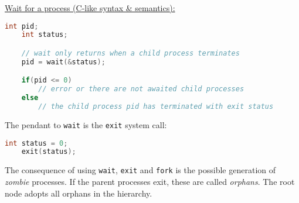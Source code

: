 \par{
	\noindent\underline{Wait for a process (C-like syntax \& semantics):}
	\begin{lstlisting}[language = C, frame = none]
	int pid;
	int status;

	// wait only returns when a child process terminates
	pid = wait(&status);

	if(pid <= 0)
		// error or there are not awaited child processes
	else
		// the child process pid has terminated with exit status
	\end{lstlisting}
}
\par{
	\noindent The pendant to \texttt{wait} is the \texttt{exit} system call:
	\begin{lstlisting}[language = C, frame = none]
	int status = 0;
	exit(status);
	\end{lstlisting}
}
\par{
	\noindent
	The consequence of using \texttt{wait}, \texttt{exit} and \texttt{fork} is the possible generation of \textit{zombie} processes. \newline
	If the parent processes exit, these are called \textit{orphans}. The root node adopts all orphans in the hierarchy.
}
